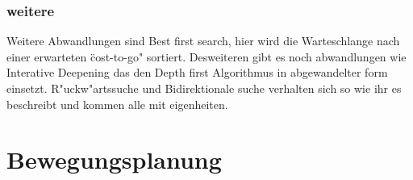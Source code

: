 \subsubsection{weitere}
Weitere Abwandlungen sind Best first search, hier wird die Warteschlange nach einer erwarteten \"cost-to-go" sortiert. 
Desweiteren gibt es noch abwandlungen wie Interative Deepening das den Depth first Algorithmus in abgewandelter form einsetzt. 
R"uckw"artssuche und Bidirektionale suche verhalten sich so wie ihr es beschreibt und kommen alle mit eigenheiten. 


\section{Bewegungsplanung}
 

